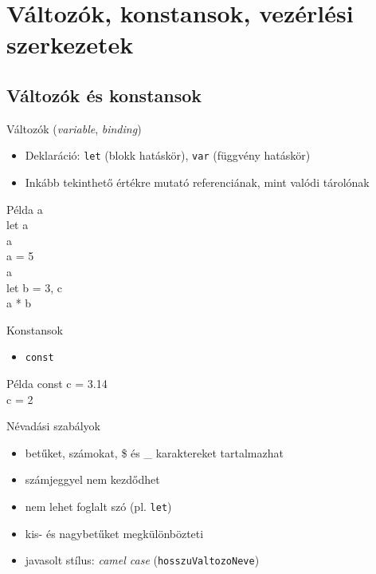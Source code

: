 \section{Változók, konstansok, vezérlési szerkezetek}

\subsection{Változók és konstansok}

\begin{frame}
    Változók (\emph{variable}, \emph{binding})
    \begin{itemize}
        \item Deklaráció: \texttt{let} (blokk hatáskör), \texttt{var} (függvény hatáskör)
        \item Inkább tekinthető értékre mutató referenciának, mint valódi tárolónak
    \end{itemize}
    \begin{exampleblock}{Példa}
        a \\
        let a\\
        a \\
        a = 5\\
        a \\
        let b = 3, c\\
        a * b \\
    \end{exampleblock}
\end{frame}

\begin{frame}
    Konstansok
    \begin{itemize}
        \item \texttt{const}
    \end{itemize}
    \begin{exampleblock}{Példa}
        const c = 3.14\\
        c = 2 
    \end{exampleblock}
    \vfill
    Névadási szabályok
    \begin{itemize}
        \item betűket, számokat, \$ és \_ karaktereket tartalmazhat
        \item számjeggyel nem kezdődhet
        \item nem lehet foglalt szó (pl. \texttt{let})
        \item kis- és nagybetűket megkülönbözteti
        \item javasolt stílus: \emph{camel case} (\texttt{hosszuValtozoNeve})
    \end{itemize}
\end{frame}

